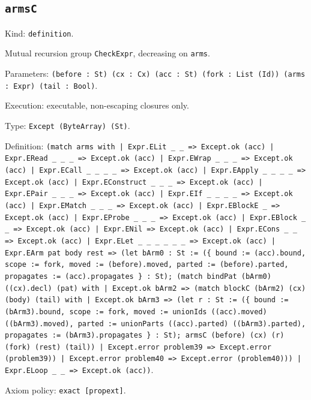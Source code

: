\documentclass[11pt]{article}
\begin{document}
\subsection*{\texttt{armsC}}
\noindent Kind: \texttt{definition}.\par
\noindent Mutual recursion group \texttt{CheckExpr}, decreasing on \texttt{arms}.\par
\noindent Parameters: \texttt{(before : St) (cx : Cx) (acc : St) (fork : List (Id)) (arms : Expr) (tail : Bool)}.\par
\noindent Execution: executable, non-escaping closures only.\par
\noindent Type: \texttt{Except (ByteArray) (St)}.\par
\noindent Definition: \texttt{(match arms with | Expr.ELit \_ \_ => Except.ok (acc) | Expr.ERead \_ \_ \_ => Except.ok (acc) | Expr.EWrap \_ \_ \_ => Except.ok (acc) | Expr.ECall \_ \_ \_ \_ => Except.ok (acc) | Expr.EApply \_ \_ \_ \_ => Except.ok (acc) | Expr.EConstruct \_ \_ \_ => Except.ok (acc) | Expr.EPair \_ \_ \_ => Except.ok (acc) | Expr.EIf \_ \_ \_ \_ => Except.ok (acc) | Expr.EMatch \_ \_ \_ => Except.ok (acc) | Expr.EBlockE \_ => Except.ok (acc) | Expr.EProbe \_ \_ \_ => Except.ok (acc) | Expr.EBlock \_ \_ => Except.ok (acc) | Expr.ENil => Except.ok (acc) | Expr.ECons \_ \_ => Except.ok (acc) | Expr.ELet \_ \_ \_ \_ \_ \_ => Except.ok (acc) | Expr.EArm pat body rest => (let bArm0 : St := (\{ bound := (acc).bound, scope := fork, moved := (before).moved, parted := (before).parted, propagates := (acc).propagates \} : St); (match bindPat (bArm0) ((cx).decl) (pat) with | Except.ok bArm2 => (match blockC (bArm2) (cx) (body) (tail) with | Except.ok bArm3 => (let r : St := (\{ bound := (bArm3).bound, scope := fork, moved := unionIds ((acc).moved) ((bArm3).moved), parted := unionParts ((acc).parted) ((bArm3).parted), propagates := (bArm3).propagates \} : St); armsC (before) (cx) (r) (fork) (rest) (tail)) | Except.error problem39 => Except.error (problem39)) | Except.error problem40 => Except.error (problem40))) | Expr.ELoop \_ \_ => Except.ok (acc))}.\par
\noindent Axiom policy: \texttt{exact [propext]}.\par
\end{document}
